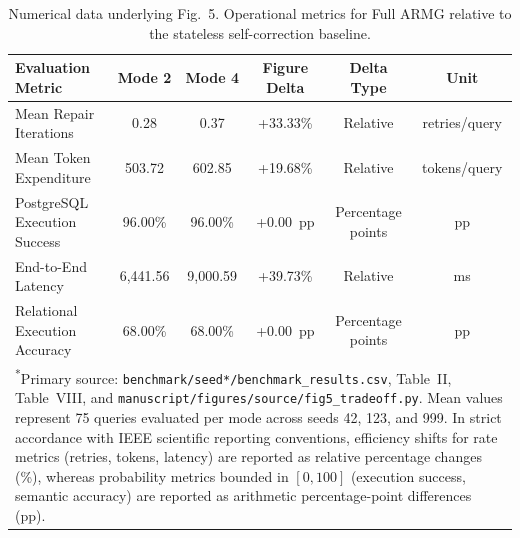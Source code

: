 \begin{table}[t]
\centering
\caption{Numerical data underlying Fig.~5. Operational metrics for Full ARMG relative to the stateless self-correction baseline.}
\label{tab:fig5_validation}
\footnotesize
\begin{tabular}{lccccc}
\toprule
\textbf{Evaluation Metric} & \textbf{Mode 2} & \textbf{Mode 4} & \textbf{Figure Delta} & \textbf{Delta Type} & \textbf{Unit} \\
\midrule
Mean Repair Iterations & 0.28 & 0.37 & +33.33\% & Relative & retries/query \\
Mean Token Expenditure & 503.72 & 602.85 & +19.68\% & Relative & tokens/query \\
PostgreSQL Execution Success & 96.00\% & 96.00\% & +0.00~pp & Percentage points & pp \\
End-to-End Latency & 6,441.56 & 9,000.59 & +39.73\% & Relative & ms \\
Relational Execution Accuracy & 68.00\% & 68.00\% & +0.00~pp & Percentage points & pp \\
\bottomrule
\multicolumn{6}{p{8.3cm}}{\scriptsize \textsuperscript{*}Primary source: \texttt{benchmark/seed*/benchmark\_results.csv}, Table~II, Table~VIII, and \texttt{manuscript/figures/source/fig5\_tradeoff.py}. Mean values represent 75 queries evaluated per mode across seeds 42, 123, and 999. In strict accordance with IEEE scientific reporting conventions, efficiency shifts for rate metrics (retries, tokens, latency) are reported as relative percentage changes (\%), whereas probability metrics bounded in $[0, 100]$ (execution success, semantic accuracy) are reported as arithmetic percentage-point differences (pp).} \\
\end{tabular}
\end{table}
